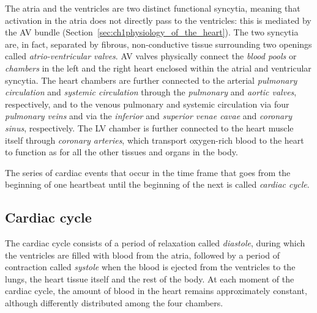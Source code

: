 \vspace{0.2cm}
The atria and the ventricles are two distinct functional syncytia, meaning that activation in the atria does not directly pass to the ventricles: this is mediated by the AV bundle (Section~\ref{sec:ch1physiology_of_the_heart}). The two syncytia are, in fact, separated by fibrous, non-conductive tissue surrounding two openings called \textit{atrio-ventricular valves}. AV valves physically connect the \textit{blood pools} or \textit{chambers} in the left and the right heart enclosed within the atrial and ventricular syncytia. The heart chambers are further connected to the arterial \textit{pulmonary circulation} and \textit{systemic circulation} through the \textit{pulmonary} and \textit{aortic valves}, respectively, and to the venous pulmonary and systemic circulation via four \textit{pulmonary veins} and via the \textit{inferior} and \textit{superior venae cavae} and \textit{coronary sinus}, respectively. The LV chamber is further connected to the heart muscle itself through \textit{coronary arteries}, which transport oxygen-rich blood to the heart to function as for all the other tissues and organs in the body. 

\vspace{0.2cm}
The series of cardiac events that occur in the time frame that goes from the beginning of one heartbeat until the beginning of the next is called \textit{cardiac cycle}.


%
%
%
\subsection{Cardiac cycle}\label{sec:ch1cardiac_cycle}
The cardiac cycle consists of a period of relaxation called \textit{diastole}, during which the ventricles are filled with blood from the atria, followed by a period of contraction called \textit{systole} when the blood is ejected from the ventricles to the lungs, the heart tissue itself and the rest of the body. At each moment of the cardiac cycle, the amount of blood in the heart remains approximately constant, although differently distributed among the four chambers.

